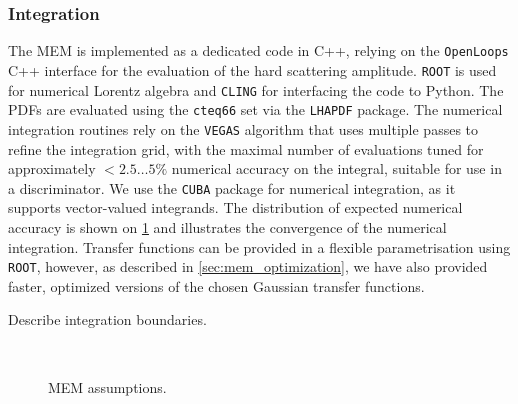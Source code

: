 \subsubsection{Integration}
\label{sec:mem_integration}

The MEM is implemented as a dedicated code in C++, relying on the \texttt{OpenLoops} C++ interface for the evaluation of the hard scattering amplitude. \texttt{ROOT} is used for numerical Lorentz algebra and \texttt{CLING} for interfacing the code to Python. The PDFs are evaluated using the \texttt{cteq66} set via the \texttt{LHAPDF} package. The numerical integration routines rely on the \texttt{VEGAS} algorithm that uses multiple passes to refine the integration grid, with the maximal number of evaluations tuned for approximately $<2.5 \dots 5\%$ numerical accuracy on the integral, suitable for use in a discriminator. We use the \texttt{CUBA} package for numerical integration, as it supports vector-valued integrands. The distribution of expected numerical accuracy is shown on \cref{fig:mem_numerical_accuracy} and illustrates the convergence of the numerical integration. Transfer functions can be provided in a flexible parametrisation using \texttt{ROOT}, however, as described in \cref{sec:mem_optimization}, we have also provided faster, optimized versions of the chosen Gaussian transfer functions. 

\fix Describe integration boundaries.

\begin{figure}
\begin{centering}
\\
\caption{MEM assumptions.}
\label{fig:mem_numerical_accuracy}
\end{centering}
\end{figure}


